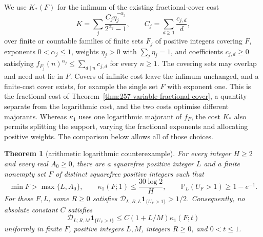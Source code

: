 \documentclass[11pt]{article}
\theoremstyle{plain}
\newtheorem{thm}{Theorem}[section]
\theoremstyle{definition}
\theoremstyle{remark}
\begin{document}
We use $K_*(F)$ for the infimum of the existing fractional-cover cost
\begin{equation}
 K=\sum_j\frac{C_j\eta_j^{-\alpha_j}}{2^{\alpha_j}-1},\qquad
 C_j=\sum_{d\ge1}\frac{c_{j,d}}d,
 \label{eq:257-optimised-cover-cost}
\end{equation}
over finite or countable families of finite sets $F_j$ of positive integers covering
$F$, exponents $0<\alpha_j\le1$, weights $\eta_j>0$ with
$\sum_j\eta_j=1$, and coefficients $c_{j,d}\ge0$ satisfying
$f_{F_j}(n)^{\alpha_j}\le\sum_{d\mid n}c_{j,d}$ for every $n\ge1$.
The covering sets may overlap and need not lie in $F$.  Covers of infinite
cost leave the infimum unchanged, and a finite-cost cover exists, for example
the single set $F$ with exponent one.  This is the fractional cost of
Theorem~\ref{thm:257-variable-fractional-cover}, a quantity separate from
the logarithmic cost, and the two costs optimise different majorants.
Whereas $\kappa_1$ uses one logarithmic majorant of $f_F$, the cost $K_*$ also permits
splitting the support, varying the fractional exponents and allocating
positive weights. The comparison below allows all of those choices.

\begin{thm}[arithmetic logarithmic counterexample]\label{thm:257-logarithmic-counterexample}
For every integer $H\ge2$ and every real $A_0\ge0$, there are a
squarefree positive integer $L$ and a finite nonempty set $F$ of distinct
squarefree positive integers such that
\[
 \min F>\max\{L,A_0\},\qquad
 \kappa_1(F;1)\le\frac{30\log2}{H},\qquad
 \mathbb P_L(U_F>1)\ge1-e^{-1}.
\]
For these $F,L$, some $R\ge0$ satisfies
$\mathscr D_{L;R,L}\mathbf1_{\{U_F>1\}}>1/2$.
Consequently, no absolute constant $C$ satisfies
\begin{equation*}
 \mathscr D_{L;R,M}\mathbf1_{\{U_F>t\}}
 \le C(1+L/M)\kappa_1(F;t)
 \tag{E}
\end{equation*}
uniformly in finite $F$, positive integers $L,M$, integers $R\ge0$,
and $0<t\le1$.
\end{thm}
\end{document}
